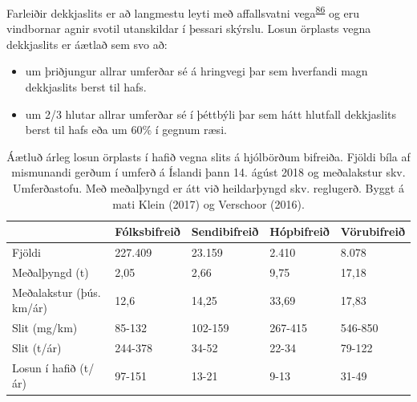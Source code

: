 \documentclass[icelandic,]{book}
\providecommand{\tightlist}{%
  \setlength{\itemsep}{0pt}\setlength{\parskip}{0pt}}
\begin{document}
Farleiðir dekkjaslits er að langmestu leyti með affallsvatni vega\textsuperscript{\protect\hyperlink{ref-Verschoor2016}{86}} og eru vindbornar agnir svotil utanskildar í þessari skýrslu. Losun örplasts vegna dekkjaslits er áætlað sem svo að:

\begin{itemize}
\tightlist
\item
  um þriðjungur allrar umferðar sé á hringvegi þar sem hverfandi magn dekkjaslits berst til hafs.
\item
  um 2/3 hlutar allrar umferðar sé í þéttbýli þar sem hátt hlutfall dekkjaslits berst til hafs eða um 60\% í gegnum ræsi.
\end{itemize}


\begin{table}[t]

\caption{\label{tab:akstur}Áætluð árleg losun örplasts í hafið vegna slits á hjólbörðum bifreiða. Fjöldi bíla af mismunandi gerðum í umferð á Íslandi þann 14. ágúst 2018 og meðalakstur skv. Umferðastofu. Með meðalþyngd er átt við heildarþyngd skv. reglugerð. Byggt á mati Klein (2017) og Verschoor (2016).}
\centering
\begin{tabular}{p{3cm}llll}
\toprule
  & Fólksbifreið & Sendibifreið & Hópbifreið & Vörubifreið\\
\midrule
\rowcolor{gray!6} Fjöldi & 227.409 & 23.159 & 2.410 & 8.078\\
Meðalþyngd (t) & 2,05 & 2,66 & 9,75 & 17,18\\
\rowcolor{gray!6} Meðalakstur (þús. km/ár) & 12,6 & 14,25 & 33,69 & 17,83\\
Slit (mg/km) & 85-132 & 102-159 & 267-415 & 546-850\\
\rowcolor{gray!6} Slit (t/ár) & 244-378 & 34-52 & 22-34 & 79-122\\
Losun í hafið (t/ár) & 97-151 & 13-21 & 9-13 & 31-49\\
\bottomrule
\end{tabular}
\end{table}
\end{document}
